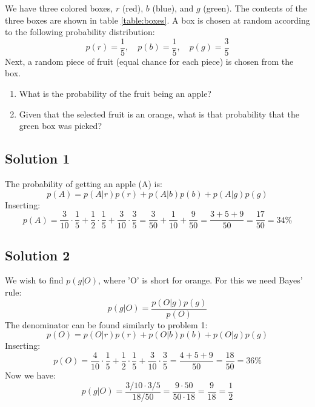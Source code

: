 \documentclass[12pt, a4paper]{article}
\numberwithin{equation}{section}
\begin{document}
We have three colored boxes, $r$ (red), $b$ (blue), and $g$ (green). The contents of the three boxes are shown in table \ref{table:boxes}. A box is chosen at random according to the following probability distribution:
\begin{equation}
p(r)=\frac{1}{5},\quad p(b)=\frac{1}{5},\quad p(g)=\frac{3}{5}
\end{equation}
Next, a random piece of fruit (equal chance for each piece) is chosen from the box.

\begin{enumerate}
\item What is the probability of the fruit being an apple?
\item Given that the selected fruit is an orange, what is that probability that the green box was picked?
\end{enumerate}

\subsection{Solution 1}
The probability of getting an apple (A) is:
\begin{equation}
p(A)=p(A|r)p(r)+p(A|b)p(b)+p(A|g)p(g)
\end{equation}
Inserting:
\begin{equation}
p(A)=\frac{3}{10}\cdot\frac{1}{5}+\frac{1}{2}\cdot\frac{1}{5}+\frac{3}{10}\cdot\frac{3}{5}=\frac{3}{50}+\frac{1}{10}+\frac{9}{50}=\frac{3+5+9}{50}=\frac{17}{50}=34\%
\end{equation}

\subsection{Solution 2}
We wish to find $p(g|O)$, where 'O' is short for orange. For this we need Bayes' rule:
\begin{equation}
p(g|O)=\frac{p(O|g)p(g)}{p(O)}
\end{equation}
The denominator can be found similarly to problem 1:
\begin{equation}
p(O)=p(O|r)p(r)+p(O|b)p(b)+p(O|g)p(g)
\end{equation}
Inserting:
\begin{equation}
p(O)=\frac{4}{10}\cdot\frac{1}{5}+\frac{1}{2}\cdot\frac{1}{5}+\frac{3}{10}\cdot\frac{3}{5}=\frac{4+5+9}{50}=\frac{18}{50}=36\%
\end{equation}
Now we have:
\begin{equation}
p(g|O)=\frac{3/10\cdot 3/5}{18/50}=\frac{9\cdot 50}{50\cdot 18}=\frac{9}{18}=\frac{1}{2}
\end{equation}
\end{document}
